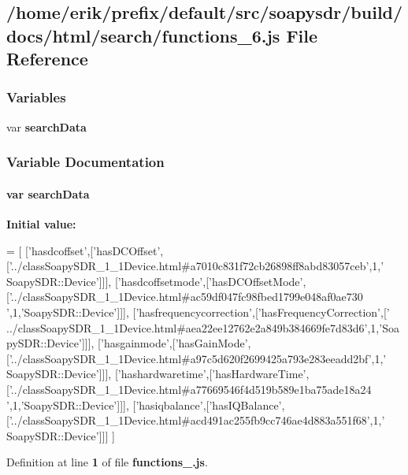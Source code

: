 \subsection{/home/erik/prefix/default/src/soapysdr/build/docs/html/search/functions\+\_\+6.js File Reference}
\label{functions__6_8js}
\subsubsection*{Variables}
\begin{DoxyCompactItemize}
\item 
var {\bf search\+Data}
\end{DoxyCompactItemize}


\subsubsection{Variable Documentation}
\paragraph[{search\+Data}]{\setlength{\rightskip}{0pt plus 5cm}var search\+Data}\label{functions__6_8js_ad01a7523f103d6242ef9b0451861231e}
{\bfseries Initial value\+:}
\begin{DoxyCode}
=
[
  [\textcolor{stringliteral}{'hasdcoffset'},[\textcolor{stringliteral}{'hasDCOffset'},[\textcolor{stringliteral}{'../classSoapySDR\_1\_1Device.html#a7010c831f72cb26898ff8abd83057ceb'},1,\textcolor{stringliteral}{'
      SoapySDR::Device'}]]],
  [\textcolor{stringliteral}{'hasdcoffsetmode'},[\textcolor{stringliteral}{'hasDCOffsetMode'},[\textcolor{stringliteral}{'../classSoapySDR\_1\_1Device.html#ac59df047fc98fbed1799e048af0ae730
      '},1,\textcolor{stringliteral}{'SoapySDR::Device'}]]],
  [\textcolor{stringliteral}{'hasfrequencycorrection'},[\textcolor{stringliteral}{'hasFrequencyCorrection'},[\textcolor{stringliteral}{'
      ../classSoapySDR\_1\_1Device.html#aea22ee12762e2a849b384669fe7d83d6'},1,\textcolor{stringliteral}{'SoapySDR::Device'}]]],
  [\textcolor{stringliteral}{'hasgainmode'},[\textcolor{stringliteral}{'hasGainMode'},[\textcolor{stringliteral}{'../classSoapySDR\_1\_1Device.html#a97c5d620f2699425a793e283eeadd2bf'},1,\textcolor{stringliteral}{'
      SoapySDR::Device'}]]],
  [\textcolor{stringliteral}{'hashardwaretime'},[\textcolor{stringliteral}{'hasHardwareTime'},[\textcolor{stringliteral}{'../classSoapySDR\_1\_1Device.html#a77669546f4d519b589e1ba75ade18a24
      '},1,\textcolor{stringliteral}{'SoapySDR::Device'}]]],
  [\textcolor{stringliteral}{'hasiqbalance'},[\textcolor{stringliteral}{'hasIQBalance'},[\textcolor{stringliteral}{'../classSoapySDR\_1\_1Device.html#acd491ac255fb9cc746ae4d883a551f68'},1,\textcolor{stringliteral}{'
      SoapySDR::Device'}]]]
]
\end{DoxyCode}


Definition at line {\bf 1} of file {\bf functions\+\_.\+js}.

